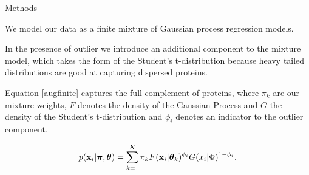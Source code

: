 \documentclass[final, 10pt]{beamer}
\newlength{\onecolwid}
\newlength{\twocolwid}
\begin{document}
\begin{frame}[t]
\begin{columns}[t]
\begin{column}{\twocolwid} %

  \begin{columns}[t,totalwidth=\twocolwid] %

    \begin{column}{\onecolwid}\vspace{-.6in} %


      \begin{block}{Methods}
        \begin{itemize}
        \small{
        \item We model our data as a finite mixture of Gaussian process regression models.
    	\item In the presence of outlier we introduce an additional component to the mixture model, which takes the form of the Student's t-distribution because heavy tailed distributions are good at capturing dispersed proteins.
    	\item Equation \ref{augfinite} captures the full complement of proteins, where $\pi_k$ are our mixture weights, $F$ denotes the density of the Gaussian Process and $G$ the density of the Student's t-distribution and $\phi_i$ denotes an indicator to the outlier component. 
    	} 
        \end{itemize}
	    \begin{equation}
	    p({\bf x}_i|\boldsymbol{\pi}, \boldsymbol{\theta}) = \sum_{k=1}^K \pi_k F({\bf x}_i|\boldsymbol{\theta}_k)^{\phi_i} G(x_i|\Phi)^{1 - \phi_i}.\label{augfinite}
	    \end{equation}


\end{block}
\end{column}
\end{columns}
\end{column}
\end{columns}
\end{frame}
\end{document}
